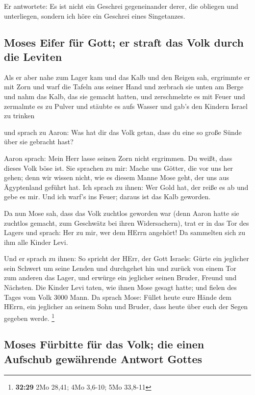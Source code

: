  Er antwortete: Es ist nicht ein Geschrei gegeneinander
derer, die obliegen und unterliegen, sondern ich höre ein Geschrei eines
Singetanzes.

\hypertarget{moses-eifer-fuxfcr-gott-er-straft-das-volk-durch-die-leviten}{%
\subsection{Moses Eifer für Gott; er straft das Volk durch die
Leviten}\label{moses-eifer-fuxfcr-gott-er-straft-das-volk-durch-die-leviten}}

 Als er aber nahe zum Lager kam und das Kalb und den
Reigen sah, ergrimmte er mit Zorn und warf die Tafeln aus seiner Hand
und zerbrach sie unten am Berge  und nahm das Kalb, das
sie gemacht hatten, und zerschmelzte es mit Feuer und zermalmte es zu
Pulver und stäubte es aufs Wasser und gab's den Kindern Israel zu
trinken

 und sprach zu Aaron: Was hat dir das Volk getan, dass du
eine so große Sünde über sie gebracht hast?

 Aaron sprach: Mein Herr lasse seinen Zorn nicht
ergrimmen. Du weißt, dass dieses Volk böse ist.  Sie
sprachen zu mir: Mache uns Götter, die vor uns her gehen; denn wir
wissen nicht, wie es diesem Manne Mose geht, der uns aus Ägyptenland
geführt hat.  Ich sprach zu ihnen: Wer Gold hat, der
reiße es ab und gebe es mir. Und ich warf's ins Feuer; daraus ist das
Kalb geworden.

 Da nun Mose sah, dass das Volk zuchtlos geworden war
(denn Aaron hatte sie zuchtlos gemacht, zum Geschwätz bei ihren
Widersachern),  trat er in das Tor des Lagers und sprach:
Her zu mir, wer dem HErrn angehört! Da sammelten sich zu ihm alle Kinder
Levi.

 Und er sprach zu ihnen: So spricht der HErr, der Gott
Israels: Gürte ein jeglicher sein Schwert um seine Lenden und durchgehet
hin und zurück von einem Tor zum anderen das Lager, und erwürge ein
jeglicher seinen Bruder, Freund und Nächsten.  Die Kinder
Levi taten, wie ihnen Mose gesagt hatte; und fielen des Tages vom Volk
3000 Mann.  Da sprach Mose: Füllet heute eure Hände dem
HErrn, ein jeglicher an seinem Sohn und Bruder, dass heute über euch der
Segen gegeben werde. \footnote{\textbf{32:29} 2Mo 28,41; 4Mo 3,6-10; 5Mo
  33,8-11}

\hypertarget{moses-fuxfcrbitte-fuxfcr-das-volk-die-einen-aufschub-gewuxe4hrende-antwort-gottes}{%
\subsection{Moses Fürbitte für das Volk; die einen Aufschub gewährende
Antwort
Gottes}\label{moses-fuxfcrbitte-fuxfcr-das-volk-die-einen-aufschub-gewuxe4hrende-antwort-gottes}}

